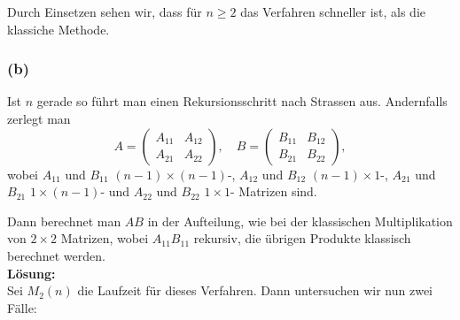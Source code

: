\documentclass[11pt,a4paper,ngerman]{article}
\begin{document}
Durch Einsetzen sehen wir, dass für $n \geq 2$ das Verfahren schneller ist, als die klassiche Methode.



\subsubsection*{(b)}
Ist $n$ gerade so führt man einen Rekursionsschritt nach Strassen aus.
Andernfalls zerlegt man
$$
A = \left( \begin{array}{cc} A_{11} & A_{12}\\A_{21} & A_{22}\end{array} \right),
\quad
B = \left( \begin{array}{cc} B_{11} & B_{12}\\B_{21} & B_{22}\end{array} \right),
$$
wobei $A_{11}$ und $B_{11}$ $(n-1) \times (n-1)$-, $A_{12}$ und $B_{12}$ $(n-1)\times 1$-, $A_{21}$ und $B_{21}$ $1\times (n-1)$- und $A_{22}$ und $B_{22}$ $1 \times 1$- Matrizen sind.

Dann berechnet man $AB$ in der Aufteilung, wie bei der klassischen Multiplikation von $2\times 2$ Matrizen, wobei $A_{11}B_{11}$ rekursiv, die übrigen Produkte klassisch berechnet werden.\\

\textbf{Lösung:}\\
Sei $M_2(n)$ die Laufzeit für dieses Verfahren. Dann untersuchen wir nun zwei Fälle:
\end{document}
